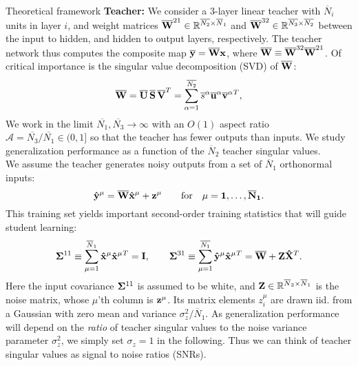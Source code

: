 \documentclass[final]{beamer}
\newcommand{\R}{\mathbb{R}}
\newcommand{\bb}[1]{{\bf\overline{#1}}}
\newcommand{\bh}[1]{{\bf\hat{#1}}}
\begin{document}
\begin{frame}[t]{}
\begin{columns}
\begin{column}{0.25\textwidth}
\begin{block}{\large Theoretical framework}
\textbf{Teacher:} We consider a 3-layer linear teacher with \(\overline{N}_i\) units in layer \(i\), and weight matrices \({\bf\overline{W}}^{21} \in \R^{\overline{N_2} \times \overline{N}_1}\) and \({\bf\overline{W}}^{32} \in \R^{\overline{N_3} \times \overline{N_2}}\) between the input to hidden, and hidden to output layers, respectively. 
The teacher network thus computes the composite map \(\bb{y} = \bb{W} \bf{x}\), where \( \bb{W} \equiv \bb{W}^{32}\bb{W}^{21} \). Of critical importance is the singular value decomposition (SVD) of \(\bb{W}\):
\begin{equation}
\bb{W} = \bb{U}\,\bb{S}\,\bb{V}^T = \sum_{\alpha=1}^{\overline{N_2}} \overline{s}^\alpha \bb{u}^\alpha \bb{v}^\alpha{}^T,
\label{eq:teachersvd}
\end{equation}
We work in the limit $\overline{N_1}, \overline{N_3} \rightarrow \infty$ with an $O(1)$ aspect ratio $\mathcal{A}=\overline{N_3}/\overline{N_1} \in (0,1]$ so that the teacher has fewer outputs than inputs. We study generalization performance as a function of the \(\overline{N}_2\) teacher singular values. \\[10pt] 
We assume the teacher generates noisy outputs from a set of \(\overline{N}_1\) orthonormal inputs:
\begin{equation}
\bh{y}^{\mu} = \bb{W}\bh{x}^\mu + \bf{z} ^ \mu \qquad \text{for} \quad \mu = 1, \dots, \overline{N}_1.
\label{eq:traindata}
\end{equation}
This training set yields important second-order training statistics that will guide student learning:
\begin{equation}
{\bf\Sigma}^{11} \equiv \sum_{\mu=1}^{\overline{N}_1} {\bh x}^\mu {\bh x}^\mu{}^T = {\bf I},
\qquad
{\bf \Sigma}^{31} \equiv \sum_{\mu=1}^{\overline{N_1}} \bh{y}^\mu {\bh x}^\mu{}^T = \bb{W} + {\bf Z}{\bh X}^T.
\label{eq:secondorder}
\end{equation}
Here the input covariance \({\bf\Sigma}^{11}\) is assumed to be white, and \({\bf Z} \in \R^{\overline{N}_3 \times \overline{N}_1}\) is the noise matrix, whose $\mu$'th column is $\bf{z}^\mu$. Its matrix elements \(z^\mu_i\) are drawn iid. from a Gaussian with zero mean and variance \(\sigma_z^2 / {\overline{N}_1}\). As generalization performance will depend on the {\it ratio} of teacher singular values to the noise variance parameter $\sigma^2_z$, we simply set $\sigma_z=1$ in the following. Thus we can think of teacher singular values as signal to noise ratios (SNRs). \\[0.5em]

\end{block}
\end{column}
\end{columns}
\end{frame}
\end{document}

